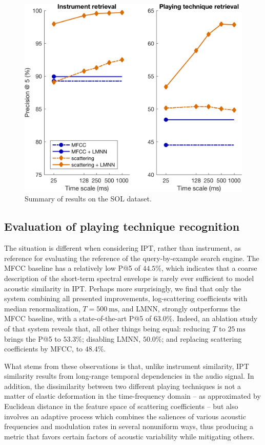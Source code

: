 \begin{figure}
\includegraphics[width=0.5\linewidth,keepaspectratio]{./figs/results/results.png}
\caption{Summary of results on the SOL dataset.}
\label{fig:results}
\end{figure}

\subsection{Evaluation of playing technique recognition}

The situation is different when considering IPT, rather than instrument, as reference for evaluating the reference of the query-by-example search engine.
The MFCC baseline has a relatively low P@5 of $44.5\%$, which indicates that a coarse description of the short-term spectral envelope is rarely ever sufficient to model acoustic similarity in IPT.
Perhaps more surprisingly, we find that only the system combining all presented improvements, \ie{} log-scattering coefficients with median renormalization, $T=\SI{500}{\milli\second}$, and LMNN, strongly outperforms the MFCC baseline, with a state-of-the-art P@5 of $63.0\%$.
Indeed, an ablation study of that system reveals that, all other things being equal: reducing $T$ to $\SI{25}{\milli\second}$ brings the P@5 to $53.3\%$; disabling LMNN, $50.0\%$; and replacing scattering coefficients by MFCC, to $48.4\%$.


What stems from these observations is that, unlike instrument similarity, IPT similarity results from long-range temporal dependencies in the audio signal.
In addition, the dissimilarity between two different playing techniques is not a matter of elastic deformation in the time-frequency domain -- as approximated by Euclidean distance in the feature space of scattering coefficients -- but also involves an adaptive process which combines the saliences of various acoustic frequencies and modulation rates in several nonuniform ways, thus producing a metric that favors certain factors of acoustic variability while mitigating others.



